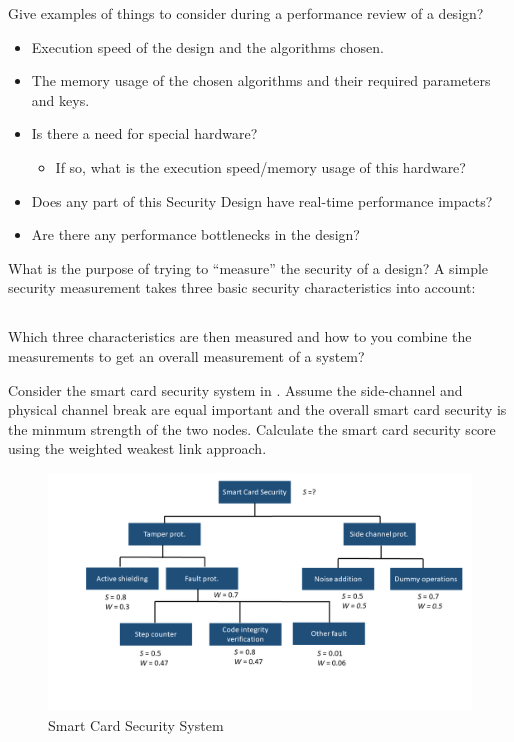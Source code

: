 \begin{questions}
\question{} Give examples of things to consider during a performance review of a design?
  \begin{solution}
    \begin{itemize}[noitemsep]
    \item Execution speed of the design and the algorithms chosen.
    \item The memory usage of the chosen algorithms and their required parameters and keys.
    \item Is there a need for special hardware?
      \begin{itemize}[noitemsep]
      \item If so, what is the execution speed/memory usage of this hardware?
      \end{itemize}
    \item Does any part of this Security Design have real-time performance impacts?
    \item Are there any performance bottlenecks in the design?
    \end{itemize}
  \end{solution}

\question{} What is the purpose of trying to ``measure'' the security of a design?
\question{} A simple security measurement takes three basic security characteristics into account:
  \begin{parts}
  \part{} Which three characteristics are then measured and how to you combine the measurements to get an overall measurement of a system?
  \end{parts}

\question{} Consider the smart card security system in .
  Assume the side-channel and physical channel break are equal important and the overall smart card security is the minmum strength of the two nodes.
  Calculate the smart card security score using the weighted weakest link approach.
  \begin{figure}[h!]
    \centering
    \includegraphics[scale=0.35]{./Drawings/EITP20-Secure_Systems_Engineering/Smart_Card_Security_System.png}
    \caption{Smart Card Security System}
    \label{fig:Smart_Card_Security_System}
  \end{figure}



\end{questions}

